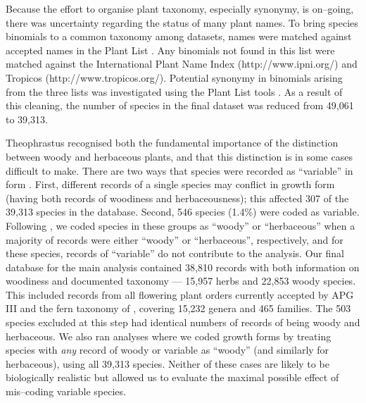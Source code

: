 \documentclass[a4paper,12pt]{article}
\begin{document}
Because the effort to organise plant taxonomy, especially synonymy, is
on--going, there was uncertainty regarding the status of many plant
names.
%
To bring species binomials to a common taxonomy among datasets, names
were matched against accepted names in the Plant List
\citep{ThePlantList}.  Any binomials not found in this list were
matched against the International Plant Name Index
(http://www.ipni.org/) and Tropicos (http://www.tropicos.org/).
Potential synonymy in binomials arising from the three lists was
investigated using the Plant List tools \citep{ThePlantList}.  
As a result of this cleaning, the number of species in the final
dataset was reduced from 49,061 to 39,313.

Theophrastus recognised both the fundamental importance of the
distinction between woody and herbaceous plants, and that this
distinction is in some cases difficult to make.  There are two ways
that species were recorded as ``variable'' in form
\citep{beaulieuHiddenRates}.  First, different records of a single
species may conflict in growth form (having both records of woodiness
and herbaceousness); this affected 307 of the 39,313 species in the
database.
Second, 546 species (1.4\%) were coded as variable.
Following \citet{beaulieuHiddenRates}, we coded species in these
groups as ``woody'' or ``herbaceous'' when a majority of records were
either ``woody'' or ``herbaceous'', respectively, and for these
species, records of ``variable'' do not contribute to the analysis.
%
%
Our final database for the main analysis contained 38,810 records with
both information on woodiness and documented taxonomy --- 15,957 herbs
and 22,853 woody species.  
This included records from all flowering plant orders currently
accepted by APG III \citep{APG3} and the fern taxonomy of
\citet{apweb}, covering 15,232 genera and 465 families.
The 503 species excluded at this step had identical numbers of records
of being woody and herbaceous.
We also ran analyses where we coded growth forms by treating species
with \emph{any} record of woody or variable as ``woody'' (and
similarly for herbaceous), using all 39,313 species.  Neither of these
cases are likely to be biologically realistic but allowed us to
evaluate the maximal possible effect of mis--coding variable species.
\end{document}
